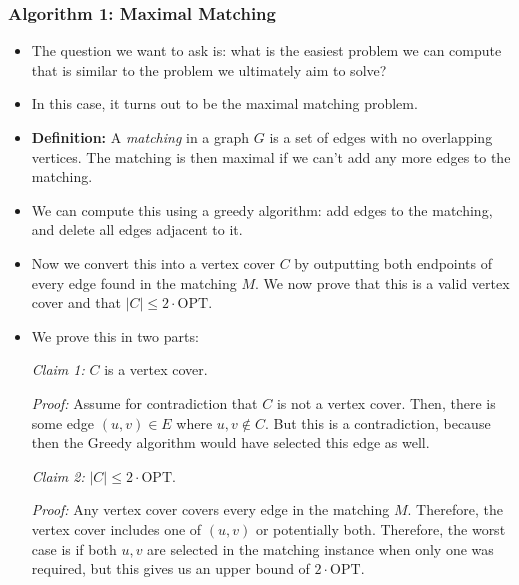 \subsubsection{Algorithm 1: Maximal Matching}
\begin{itemize}
	\item The question we want to ask is: what is the easiest problem we can compute that is similar to the 
		problem we ultimately aim to solve?
	\item In this case, it turns out to be the maximal matching problem. 
	\item \textbf{Definition:} A \textit{matching} in a graph \( G \) is a set of edges with no 
		overlapping vertices. The matching is then maximal if we can't add any more edges to the matching. 
	\item We can compute this using a greedy algorithm: add edges to the matching, and delete all edges adjacent 
		to it. 



	\item Now we convert this into a vertex cover \( C \) by outputting both endpoints of every edge found in the
		matching \( M \). We now prove that this is a valid vertex cover and that 
		\( |C| \le  2 \cdot \text{OPT} \).  
	\item We prove this in two parts:

		\textit{Claim 1:} \( C \) is a vertex cover. 

		\textit{Proof:} Assume for contradiction that \( C \) is not a vertex cover. Then, there is some 
		edge \( (u, v) \in E \) where \( u, v \not\in C \). But this is a contradiction, because then 
		the Greedy algorithm would have selected this edge as well. 

		\textit{Claim 2:} \( |C| \le 2 \cdot \text{OPT} \). 

		\textit{Proof:} Any vertex cover covers every edge in the matching \( M \). Therefore, the vertex cover 
		includes one of \( (u, v) \) or potentially both. Therefore, the worst case is if both \( u, v \) are 
		selected in the matching instance when only one was required, but this gives us an upper bound of 
		\( 2 \cdot \text{OPT} \). 
		

		
\end{itemize}
